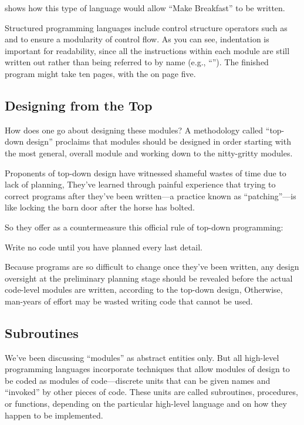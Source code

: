 
 shows how this type of language would
allow ``Make Breakfast'' to be written.

Structured programming languages include control structure operators
such as  and  to ensure a modularity of control
flow. As you can see, indentation is important for readability, since
all the instructions within each module are still written out rather
than being referred to by name (e.g., ``'').
The finished program might take ten pages, with the 
on page five.


\subsection{Designing from the Top}
How does one go about designing these modules? A methodology called
``top-down design'' proclaims that modules should be designed in order
starting with the most general, overall module and working down to the
nitty-gritty modules.

Proponents of top-down design have witnessed shameful wastes of time
due to lack of planning, They've learned through painful experience
that trying to correct programs after they've been written---a
practice known as ``patching''---is like locking the barn door after
the horse has bolted.

So they offer as a countermeasure this official rule of top-down
programming:
\begin{tfquot}
Write no code until you have planned every last detail.
\end{tfquot}
Because programs are so difficult to change once they've been written,
any design oversight at the preliminary planning stage should be
revealed before the actual code-level modules are written, according
to the top-down design, Otherwise, man-years of effort may be wasted
writing code that cannot be used.


\subsection{Subroutines}
We've been discussing ``modules'' as abstract entities only. But
all high-level programming languages incorporate techniques that allow
modules of design to be coded as modules of code---discrete units
that can be given names and ``invoked'' by other pieces of code. These
units are called subroutines, procedures, or functions, depending
on the particular high-level language and on how they happen to be
implemented.

